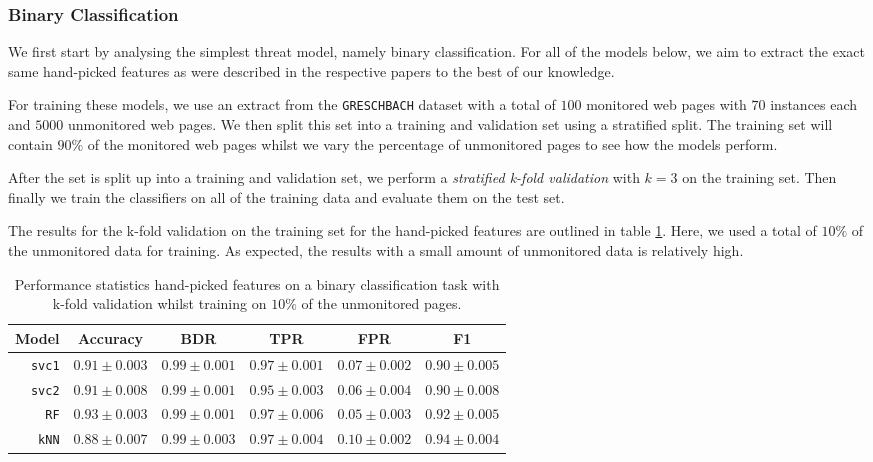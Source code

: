 \subsubsection{Binary Classification}

We first start by analysing the simplest threat model, namely binary classification.
For all of the models below, we aim to extract the exact same hand-picked features as were described in the respective papers to the best of our knowledge.

For training these models, we use an extract from the \texttt{GRESCHBACH} dataset with a total of $100$ monitored web pages with $70$ instances each and $5000$ unmonitored web pages.
We then split this set into a training and validation set using a stratified split.
The training set will contain $90\%$ of the monitored web pages whilst we vary the percentage of unmonitored pages to see how the models perform.

After the set is split up into a training and validation set, we perform a \textit{stratified k-fold validation} with $k = 3$ on the training set.
Then finally we train the classifiers on all of the training data and evaluate them on the test set.

The results for the k-fold validation on the training set for the hand-picked features are outlined in table \ref{table:hand-picked-bin}.
Here, we used a total of $10\%$ of the unmonitored data for training.
As expected, the results with a small amount of unmonitored data is relatively high.

\begin{table}[ht]
  \centering
  \begin{tabular}{ r  r  r  r  r  r } \hline
    \multicolumn{1}{c}{\textbf{Model}} & \multicolumn{1}{c}{\textbf{Accuracy}} & \multicolumn{1}{c}{\textbf{BDR}} & \multicolumn{1}{c}{\textbf{TPR}} &
      \multicolumn{1}{c}{\textbf{FPR}} & \multicolumn{1}{c}{\textbf{F1}} \\ \hline

    \texttt{svc1} & $0.91 \pm 0.003$ & $0.99 \pm 0.001$ & $0.97 \pm 0.001$ & $0.07 \pm 0.002$ & $0.90 \pm 0.005$ \\

    \texttt{svc2} & $0.91 \pm 0.008$ & $0.99 \pm 0.001$ & $0.95 \pm 0.003$ & $0.06 \pm 0.004$ & $0.90 \pm 0.008$ \\

    \texttt{RF} & $0.93 \pm 0.003$ & $0.99 \pm 0.001$ & $0.97 \pm 0.006$ & $0.05 \pm 0.003$ & $0.92 \pm 0.005$ \\

    \texttt{kNN} & $0.88 \pm 0.007$ & $0.99 \pm 0.003$ & $0.97 \pm 0.004$ & $0.10 \pm 0.002$ & $0.94 \pm 0.004$ \\

    \hline
  \end{tabular}
  \caption{Performance statistics hand-picked features on a binary classification task with k-fold validation whilst training on $10\%$ of the unmonitored pages.}
  \label{table:hand-picked-bin}
\end{table}

